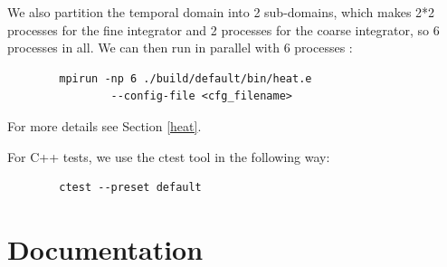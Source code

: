 \begin{enumerate}[label=\textbullet]
\begin{itemize}[label=-]
\begin{lstlisting}
\end{lstlisting}
			We also partition the temporal domain into 2 sub-domains, which makes 2*2 processes for the fine integrator and 2 processes for the coarse integrator, so 6 processes in all. We can then run in parallel with 6 processes :
\begin{lstlisting}
		mpirun -np 6 ./build/default/bin/heat.e 
				--config-file <cfg_filename>
\end{lstlisting}		
		For more details see Section \ref{heat}.
		\end{itemize}
		For C++ tests, we use the ctest tool in the following way:
\begin{lstlisting}
		ctest --preset default
\end{lstlisting}
	\end{enumerate}

\newpage

\section{Documentation}
\label{doc}

